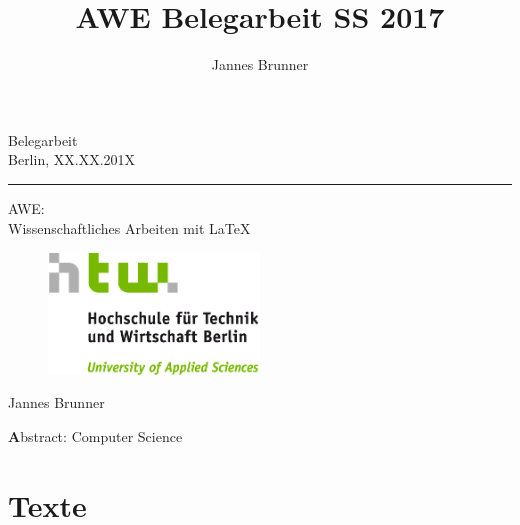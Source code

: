 \documentclass{scrreprt}
\begin{document}
\author{Jannes Brunner}
\title{AWE Belegarbeit SS 2017}

	\begin{titlepage}
		\begin{center}
			{\large Belegarbeit}\\
			{\large Berlin, XX.XX.201X}
			\vspace{0.5cm} \hrule \vspace{0.6cm}
			{\huge AWE: \\ Wissenschaftliches Arbeiten mit LaTeX \\}
			\vspace{0.8cm}
			\begin{figure}[h!]
				\centering
				\includegraphics[width=0.5\textwidth]{images/HTW_Logo_rgb.png}
			\end{figure}
		
			\vspace{0.8cm}
			\large {Jannes Brunner}
		\end{center}
		\vspace{0.6cm}
		{\textbf Abstract}: Computer Science
	
		
	\end{titlepage}
	
	\tableofcontents
	
	\chapter{Texte}
\end{document}
